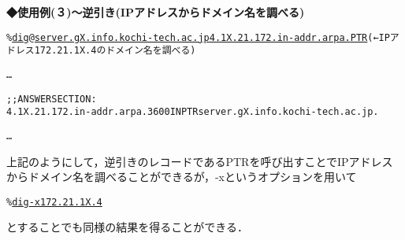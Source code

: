 \noindent
{\bf ◆使用例(３)〜逆引き(IPアドレスからドメイン名を調べる)}
\begin{center}
\begin{breakbox}
\begin{alltt}
\% \underline{dig @server.gX.info.kochi-tech.ac.jp 4.1X.21.172.in-addr.arpa. PTR}  (←IPアドレス172.21.1X.4のドメイン名を調べる)

…

;; ANSWER SECTION:
4.1X.21.172.in-addr.arpa. 3600  IN      PTR     server.gX.info.kochi-tech.ac.jp.

…

\end{alltt}
\end{breakbox}
\end{center}
上記のようにして，逆引きのレコードであるPTRを呼び出すことでIPアドレスからドメイン名を調べることができるが，-xというオプションを用いて
\begin{center}
\begin{breakbox}
\begin{alltt}
\% \underline{dig -x 172.21.1X.4}
\end{alltt}
\end{breakbox}
\end{center}
とすることでも同様の結果を得ることができる．
\clearpage
